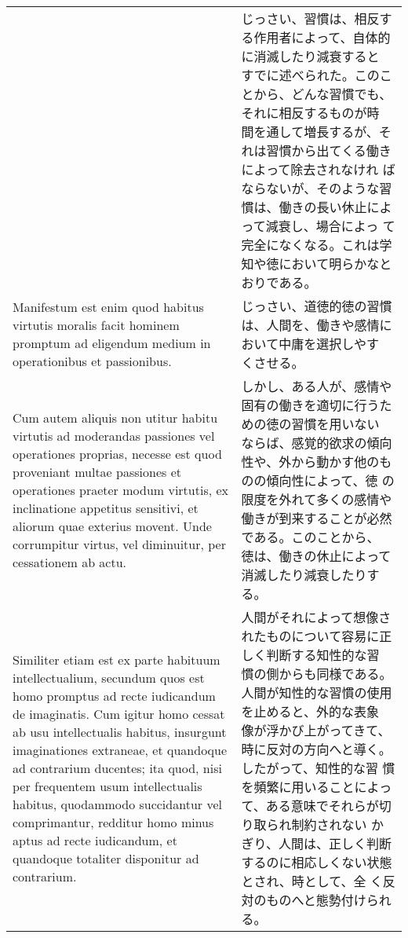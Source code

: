 \documentclass[10pt]{jsarticle} %
\begin{document}
\begin{longtable}{p{21em}p{21em}}
&

じっさい、習慣は、相反する作用者によって、自体的に消滅したり減衰すると
すでに述べられた。このことから、どんな習慣でも、それに相反するものが時
間を通して増長するが、それは習慣から出てくる働きによって除去されなけれ
ばならないが、そのような習慣は、働きの長い休止によって減衰し、場合によっ
て完全になくなる。これは学知や徳において明らかなとおりである。

\\


Manifestum est enim quod habitus virtutis moralis facit hominem
promptum ad eligendum medium in operationibus et passionibus.


&

じっさい、道徳的徳の習慣は、人間を、働きや感情において中庸を選択しやす
くさせる。


\\


Cum autem aliquis non utitur habitu virtutis ad moderandas passiones
vel operationes proprias, necesse est quod proveniant multae passiones
et operationes praeter modum virtutis, ex inclinatione appetitus
sensitivi, et aliorum quae exterius movent. Unde corrumpitur virtus,
vel diminuitur, per cessationem ab actu.


&

しかし、ある人が、感情や固有の働きを適切に行うための徳の習慣を用いない
ならば、感覚的欲求の傾向性や、外から動かす他のものの傾向性によって、徳
の限度を外れて多くの感情や働きが到来することが必然である。このことから、
徳は、働きの休止によって消滅したり減衰したりする。

\\

Similiter etiam est ex parte habituum intellectualium, secundum quos
est homo promptus ad recte iudicandum de imaginatis.  Cum igitur homo
cessat ab usu intellectualis habitus, insurgunt imaginationes
extraneae, et quandoque ad contrarium ducentes; ita quod, nisi per
frequentem usum intellectualis habitus, quodammodo succidantur vel
comprimantur, redditur homo minus aptus ad recte iudicandum, et
quandoque totaliter disponitur ad contrarium.


&

人間がそれによって想像されたものについて容易に正しく判断する知性的な習
慣の側からも同様である。人間が知性的な習慣の使用を止めると、外的な表象
像が浮かび上がってきて、時に反対の方向へと導く。したがって、知性的な習
慣を頻繁に用いることによって、ある意味でそれらが切り取られ制約されない
かぎり、人間は、正しく判断するのに相応しくない状態とされ、時として、全
く反対のものへと態勢付けられる。




\end{longtable}
\end{document}
